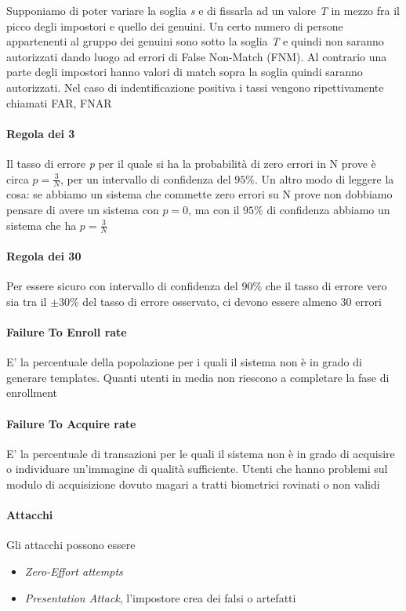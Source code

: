 Supponiamo di poter variare la soglia \textit{s} e di fissarla ad un valore \textit{T} in mezzo fra il picco degli impostori e quello dei genuini. Un certo numero di persone appartenenti al gruppo dei genuini sono sotto la soglia \textit{T} e quindi non saranno autorizzati dando luogo ad errori di False Non-Match (FNM).
Al contrario una parte degli impostori hanno valori di match sopra la soglia quindi saranno autorizzati. Nel caso di indentificazione positiva i tassi vengono ripettivamente chiamati FAR, FNAR

\paragraph{Regola dei 3}
Il tasso di errore \textit{p} per il quale si ha la probabilità di zero errori in N prove è circa $p=\frac{3}{N}$, per un intervallo di confidenza del $95\%$. Un altro modo di leggere la cosa: se abbiamo un sistema che commette zero errori su N prove non dobbiamo pensare di avere un sistema con $p=0$, ma con il $95\%$ di confidenza abbiamo un sistema che ha $p=\frac{3}{N}$

\paragraph{Regola dei 30}
Per essere sicuro con intervallo di confidenza del $90\%$ che il tasso di errore vero sia tra il $\pm30\%$ del tasso di errore osservato, ci devono essere almeno $30$ errori

\paragraph{Failure To Enroll rate}
E' la percentuale della popolazione per i quali il sistema non è in grado di generare templates. Quanti utenti in media non riescono a completare la fase di enrollment

\paragraph{Failure To Acquire rate}
E' la percentuale di transazioni per le quali il sistema non è in grado di acquisire o individuare un’immagine di qualità sufficiente. Utenti che hanno problemi sul modulo di acquisizione dovuto magari a tratti biometrici rovinati o non validi

\paragraph{Attacchi}
Gli attacchi possono essere
\begin{itemize}
    \item \textit{Zero-Effort attempts}
    \item \textit{Presentation Attack}, l’impostore crea dei falsi o artefatti 
\end{itemize}

\newpage
